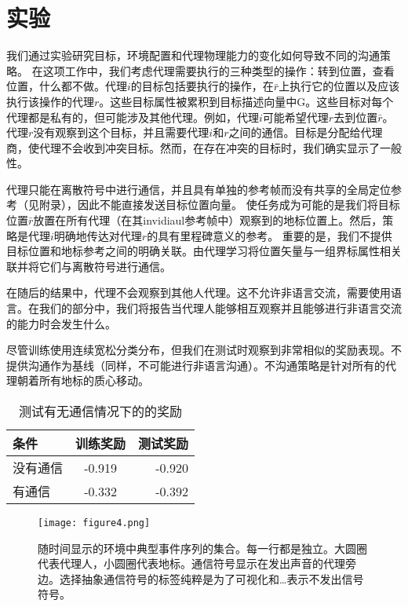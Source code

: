 \section{实验}
我们通过实验研究目标，环境配置和代理物理能力的变化如何导致不同的沟通策略。 在这项工作中，我们考虑代理需要执行的三种类型的操作：转到位置，查看位置，什么都不做。代理$i$的目标包括要执行的操作，在$\bar{r}$上执行它的位置以及应该执行该操作的代理$r$。这些目标属性被累积到目标描述向量中G。这些目标对每个代理都是私有的，但可能涉及其他代理。例如，代理$i$可能希望代理$r$去到位置$\bar{r}$。代理$r$没有观察到这个目标，并且需要代理$i$和$r$之间的通信。目标是分配给代理商，使代理不会收到冲突目标。然而，在存在冲突的目标时，我们确实显示了一般性。
\par 
代理只能在离散符号中进行通信，并且具有单独的参考帧而没有共享的全局定位参考（见附录），因此不能直接发送目标位置向量。 使任务成为可能的是我们将目标位置$\bar{r}$放置在所有代理（在其invidiaul参考帧中）观察到的地标位置上。然后，策略是代理$i$明确地传达对代理$r$的具有里程碑意义的参考。 重要的是，我们不提供目标位置和地标参考之间的明确关联。由代理学习将位置矢量与一组界标属性相关联并将它们与离散符号进行通信。
\par 
在随后的结果中，代理不会观察到其他人代理。这不允许非语言交流，需要使用语言。在我们的部分中，我们将报告当代理人能够相互观察并且能够进行非语言交流的能力时会发生什么。
\par 
尽管训练使用连续宽松分类分布，但我们在测试时观察到非常相似的奖励表现。不提供沟通作为基线（同样，不可能进行非语言沟通）。不沟通策略是针对所有的代理朝着所有地标的质心移动。
\\	
\begin{table}[!htbp]
\centering
\begin{tabular}{|l|c|r|} %
	\hline 
	条件&训练奖励&测试奖励\\
	\hline  
	没有通信&-0.919&-0.920\\
	\hline  
	有通信&-0.332&-0.392\\
	\hline 
\end{tabular}
\caption{测试有无通信情况下的的奖励}
\end{table}

\begin{figure}[htb]
	\centering
	\texttt{[image: figure4.png]}
	\caption{随时间显示的环境中典型事件序列的集合。每一行都是独立。大圆圈代表代理人，小圆圈代表地标。通信符号显示在发出声音的代理旁边。选择抽象通信符号的标签纯粹是为了可视化和…表示不发出信号符号。}\label{fig:通信符号可视化}
\end{figure}


